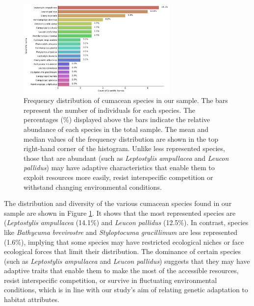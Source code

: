 \begin{figure}[htbp]
    \centering
    \includegraphics[width=0.7\textwidth]{figure2.jpg}
    \caption{Frequency distribution of cumacean species in our sample. The bars represent the number of individuals for each species. The percentages (\%) displayed above the bars indicate the relative abundance of each species in the total sample. The mean and median values of the frequency distribution are shown in the top right-hand corner of the histogram. Unlike less represented species, those that are abundant (such as \emph{Leptostylis ampullacea} and \emph{Leucon pallidus}) may have adaptive characteristics that enable them to exploit resources more easily, resist interspecific competition or withstand changing environmental conditions. \label{fig:fig3}}
\end{figure}

The distribution and diversity of the various cumacean species found in our sample are shown in Figure \ref{fig:fig3}. It shows that the most represented species are (\emph{Leptostylis ampullacea} (14.1\%) and \emph{Leucon pallidus} (12.5\%). In contrast, species like \emph{Bathycuma brevirostre} and \emph{Styloptocuma gracillimum} are less represented (1.6\%), implying that some species may have restricted ecological niches or face ecological forces that limit their distribution. The dominance of certain species (such as \emph{Leptostylis ampullacea} and \emph{Leucon pallidus}) suggests that they may have adaptive traits that enable them to make the most of the accessible resources, resist interspecific competition, or survive in fluctuating environmental conditions, which is in line with our study's aim of relating genetic adaptation to habitat attributes. 


